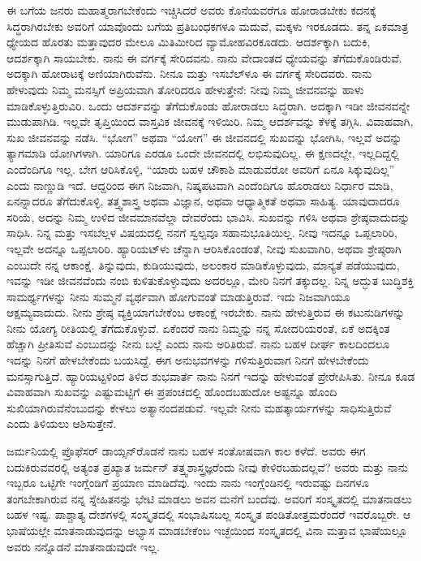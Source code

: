 ಈ ಬಗೆಯ ಜನರು ಮಹಾತ್ಮರಾಗಬೇಕೆಂದು ಇಚ್ಚಿಸಿದರೆ ಅವರು ಕೊನೆಯವರೆಗೂ ಹೋರಾಡಬೇಕು\enginline{-} ಕದನಕ್ಕೆ ಸಿದ್ಧರಾಗಿರಬೇಕು\enginline{-} ಅವರಿಗೆ ಯಾವೊಂದು ಬಗೆಯ ಪ್ರತಿಬಂಧಕಗಳೂ ಮದುವೆ, ಮಕ್ಕಳು ಇರಕೂಡದು. ತನ್ನ ಏಕಮಾತ್ರ ಧ್ಯೇಯದ ಹೊರತು ಮತ್ತಾವುದರ ಮೇಲೂ ಮಿತಿಮೀರಿದ ವ್ಯಾಮೋಹವಿರಕೂಡದು. ಆದರ್ಶಕ್ಕಾಗಿ ಬದುಕಿ, ಆದರ್ಶಕ್ಕಾಗಿ ಸಾಯಬೇಕು. ನಾನು ಈ ವರ್ಗಕ್ಕೆ ಸೇರಿದವನು. ನಾನು ವೇದಾಂತದ ಧ್ಯೇಯವನ್ನು ತೆಗೆದುಕೊಂಡಿರುವೆ. ಅದಕ್ಕಾಗಿ ಹೋರಾಟಕ್ಕೆ ಅಣಿಯಾಗಿರುವೆನು. ನೀನೂ ಮತ್ತು ಇಸಬೆಲ್‌ಳೂ ಈ ವರ್ಗಕ್ಕೆ ಸೇರಿದವರು. ನಾನು ಹೇಳುವುದು ನಿಮ್ಮ ಮನಸ್ಸಿಗೆ ಅಪ್ರಿಯವಾಗಿ ತೋರಿದರೂ ಹೇಳುತ್ತೇನೆ: ನೀವು ನಿಮ್ಮ ಜೀವನವನ್ನು ಹಾಳು ಮಾಡಿಕೊಳ್ಳುತ್ತಿರುವಿರಿ. ಒಂದು ಆದರ್ಶವನ್ನು ತೆಗೆದುಕೊಂಡು ಹೋರಾಡಲು ಸಿದ್ಧರಾಗಿ. ಅದಕ್ಕಾಗಿ ಇಡೀ ಜೀವನವನ್ನೇ ಮುಡುಪಾಗಿಡಿ. ಇಲ್ಲವೇ ತೃಪ್ತಿಯಿಂದ ವಾಸ್ತವಿಕ ಜೀವನಕ್ಕೆ ಇಳಿಯಿರಿ. ನಿಮ್ಮ ಆದರ್ಶವನ್ನು ಕೆಳಕ್ಕೆ ತಗ್ಗಿಸಿ. ವಿವಾಹವಾಗಿ, ಸುಖ ಜೀವನವನ್ನು ನಡೆಸಿ. “ಭೋಗ” ಅಥವಾ “ಯೋಗ”\enginline{-} ಈ ಜೀವನದಲ್ಲಿ ಸುಖವನ್ನು ಭೋಗಿಸಿ, ಇಲ್ಲವೆ ಅದನ್ನು ತ್ಯಾಗಮಾಡಿ ಯೋಗಿಗಳಾಗಿ. ಯಾರಿಗೂ ಎರಡೂ ಒಂದೇ ಜೀವನದಲ್ಲಿ ಲಭಿಸುವುದಿಲ್ಲ. ಈ ಕ್ಷಣದಲ್ಲೇ, ಇಲ್ಲದಿದ್ದಲ್ಲಿ ಎಂದೆಂದಿಗೂ ಇಲ್ಲ. ಬೇಗ ಆರಿಸಿಕೊಳ್ಳಿ, “ಯಾರು ಬಹಳ ಚೌಕಾಶಿ ಮಾಡುವರೋ ಅವರಿಗೆ ಏನೂ ಸಿಕ್ಕುವುದಿಲ್ಲ” ಎಂದು ನಾಣ್ಣುಡಿ ಇದೆ. ಆದ್ದರಿಂದ ಈಗ ನಿಜವಾಗಿ, ನಿಷ್ಕಪಟವಾಗಿ ಎಂದೆಂದಿಗೂ ಹೊರಾಡಲು ನಿರ್ಧಾರ ಮಾಡಿ, ಏನನ್ನಾದರೂ ತೆಗೆದುಕೊಳ್ಳಿ, ತತ್ತ್ವಶಾಸ್ತ್ರ ಅಥವಾ ವಿಜ್ಞಾನ, ಅಥವಾ ಆಧ್ಯಾತ್ಮಿಕತೆ ಅಥವಾ ಸಾಹಿತ್ಯ. ಯಾವುದಾದರೂ ಸರಿಯೆ, ಅದನ್ನು ನಿಮ್ಮ ಉಳಿದ ಜೀವಮಾನವೆಲ್ಲಾ ದೇವರೆಂದು ಭಾವಿಸಿ. ಸುಖವನ್ನು ಗಳಿಸಿ ಅಥವಾ ಶ್ರೇಷ್ಠವಾದುದನ್ನು ಸಾಧಿಸಿ. ನಿನ್ನ ಮತ್ತು ಇಸಬೆಲ್ಲಳ ವಿಷಯದಲ್ಲಿ ನನಗೆ ಸ್ವಲ್ಪವೂ ಸಹಾನುಭೂತಿಯಿಲ್ಲ. ನೀವು ಇದನ್ನೂ ಒಪ್ಪಲಾರಿರಿ, ಇಲ್ಲವೇ ಅದನ್ನೂ ಒಪ್ಪಲಾರಿರಿ. ಹ್ಯಾರಿಯಟ್‌ಳು ಚೆನ್ನಾಗಿ ಆರಿಸಿಕೊಂಡಂತೆ, ನೀವು ಸುಖವಾಗಿರಿ, ಅಥವಾ ಶ್ರೇಷ್ಠರಾಗಿ ಎಂಬುದೇ ನನ್ನ ಆಕಾಂಕ್ಷೆ. ತಿನ್ನುವುದು, ಕುಡಿಯುವುದು, ಅಲಂಕಾರ ಮಾಡಿಕೊಳ್ಳುವುದು, ಮಾನ್ಯತೆ ಪಡೆಯುವುದು, ಇವನ್ನು ಇಡೀ ಜೀವನವೆಂದು ನಂಬಿ ಕುಳಿತುಕೊಳ್ಳುವುದು\enginline{-} ಅದರಲ್ಲೂ, ಮೇರಿ ನಿನಗೆ ತಕ್ಕುದಲ್ಲ. ನಿನ್ನ ಅದ್ಭುತ ಬುದ್ಧಿಶಕ್ತಿ ಸಾಮರ್ಥ್ಯಗಳನ್ನು ನೀನು ಸುಮ್ಮನೆ ವ್ಯರ್ಥವಾಗಿ ಹೋಗುವಂತೆ ಮಾಡುತ್ತಿರುವೆ. ಇದು ನಿಜವಾಗಿಯೂ ಆಕ್ಷಮ್ಯವಾದುದು. ನೀನು ಶ್ರೇಷ್ಠ ವ್ಯಕ್ತಿಯಾಗಬೇಕೆಂಬ ಆಕಾಂಕ್ಷೆ ಇರಬೇಕು. ನಾನು ಹೇಳುತ್ತಿರುವ ಈ ಕಟುನುಡಿಗಳನ್ನು ನೀನು ಯೋಗ್ಯ ರೀತಿಯಲ್ಲಿ ತೆಗೆದುಕೊಳ್ಳುವೆ. ಏಕೆಂದರೆ ನಾನು ನಿಮ್ಮನ್ನು ನನ್ನ ಸೋದರಿಯರಂತೆ, ಏಕೆ ಅದಕ್ಕಿಂತ ಹೆಚ್ಚಾಗಿ ಪ್ರೀತಿಸುವೆ ಎಂಬುದನ್ನು ನೀನು ಬಲ್ಲೆ ಎಂದು ನಾನು ಅರಿತಿರುವೆ. ನಾನು ಬಹಳ ದೀರ್ಘ ಕಾಲದಿಂದಲೂ ಇದನ್ನು ನಿನಗೆ ಹೇಳಬೇಕೆಂದು ಬಯಸಿದ್ದೆ. ಈಗ ಅನುಭವಗಳನ್ನು ಗಳಿಸುತ್ತಿರುವಾಗ ನಿನಗೆ ಹೇಳಬೇಕೆಂದು ಮನಸ್ಸಾಗುತ್ತಿದೆ. ಹ್ಯಾರಿಯಟ್ಟಳಿಂದ ತಿಳಿದ ಶುಭವಾರ್ತೆ ನಾನು ನಿನಗೆ ಇದನ್ನು ಹೇಳುವಂತೆ ಪ್ರೇರೇಪಿಸಿತು. ನೀನೂ ಕೂಡ ವಿವಾಹವಾಗಿ ಸುಖವನ್ನು ಎಷ್ಟುಮಟ್ಟಿಗೆ ಈ ಪ್ರಪಂಚದಲ್ಲಿ ಹೊಂದಬಹುದೋ ಅಷ್ಟನ್ನೂ ಹೊಂದಿ ಸುಖಿಯಾಗಿರುವೆನೆಂಬುದನ್ನು ಕೇಳಲು ಅತ್ಯಾನಂದಪಡುವೆ. ಇಲ್ಲವೇ ನೀನು ಮಹತ್ಕಾರ್ಯಗಳನ್ನು ಸಾಧಿಸುತ್ತಿರುವೆ ಎಂದು ತಿಳಿಯಲು ಆಶಿಸುತ್ತೇನೆ.

ಜರ್ಮನಿಯಲ್ಲಿ ಪ್ರೊಫೆಸರ್ ಡಾಯ್ಸನ್‌ರೊಡನೆ ನಾನು ಬಹಳ ಸಂತೋಷವಾಗಿ ಕಾಲ ಕಳೆದೆ. ಅವರು ಈಗ ಬದುಕಿರುವವರಲ್ಲಿ ಅತ್ಯಂತ ಪ್ರಖ್ಯಾತ ಜರ್ಮನ್ ತತ್ತ್ವಶಾಸ್ತ್ರಜ್ಞರೆಂದು ನೀವು ಕೇಳಿರಬಹುದಲ್ಲವೆ? ಅವರು ಮತ್ತು ನಾನು ಇಬ್ಬರೂ ಒಟ್ಟಿಗೇ ಇಂಗ್ಲೆಂಡಿಗೆ ಪ್ರಯಾಣ ಮಾಡಿದೆವು. ಇಂದು ನಾನು ಇಂಗ್ಲೆಂಡಿನಲ್ಲಿ ಇರುವಷ್ಟು ದಿನಗಳೂ ತಂಗಬೇಕಾಗಿರುವ ನನ್ನ ಸ್ನೇಹಿತನನ್ನು ಭೇಟಿ ಮಾಡಲು ಅವನ ಮನೆಗೆ ಬಂದೆವು. ಅವರಿಗೆ ಸಂಸ್ಕೃತದಲ್ಲಿ ಮಾತನಾಡಲು ಬಹಳ ಇಷ್ಟ. ಪಾಶ್ಚಾತ್ಯ ದೇಶಗಳಲ್ಲಿ ಸಂಸ್ಕೃತದಲ್ಲಿ ಸಂಭಾಷಿಸಬಲ್ಲ ಸಂಸ್ಕೃತ ಪಂಡಿತೋತ್ತಮರೆಂದರೆ ಇವರೊಬ್ಬರೇ. ಆ ಭಾಷೆಯಲ್ಲೇ ಮಾತನಾಡುವುದನ್ನು ಅಭ್ಯಾಸ ಮಾಡಬೇಕೆಂಬ ಇಚ್ಛೆಯಿಂದ ಸಂಸ್ಕೃತದಲ್ಲಿ ವಿನಾ ಮತ್ತಾವ ಭಾಷೆಯಲ್ಲೂ ಅವರು ನನ್ನೊಡನೆ ಮಾತನಾಡುವುದೇ ಇಲ್ಲ.

